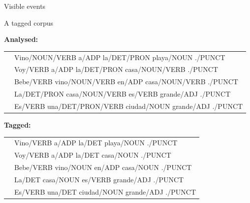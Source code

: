 \documentclass{beamer}
\begin{document}
\begin{frame}


\end{frame}



\begin{frame}{Visible events}


\end{frame}


\begin{frame}{A tagged corpus}

\textbf{Analysed:} \\
\begin{tabular}{ll}
& Vino/NOUN/VERB a/ADP la/DET/PRON playa/NOUN ./PUNCT \\
& Voy/VERB a/ADP la/DET/PRON casa/NOUN/VERB ./PUNCT \\
& Bebe/VERB vino/NOUN/VERB en/ADP casa/NOUN/VERB ./PUNCT \\
& La/DET/PRON casa/NOUN/VERB es/VERB grande/ADJ ./PUNCT \\
& Es/VERB una/DET/PRON/VERB ciudad/NOUN grande/ADJ ./PUNCT \\
\end{tabular} 

\textbf{Tagged:} \\
\begin{tabular}{ll}
& Vino/VERB a/ADP la/DET playa/NOUN ./PUNCT \\
& Voy/VERB a/ADP la/DET casa/NOUN ./PUNCT \\
& Bebe/VERB vino/NOUN en/ADP casa/NOUN ./PUNCT \\
& La/DET casa/NOUN es/VERB grande/ADJ ./PUNCT \\
& Es/VERB una/DET ciudad/NOUN grande/ADJ ./PUNCT \\
\end{tabular}

\end{frame}
\end{document}
